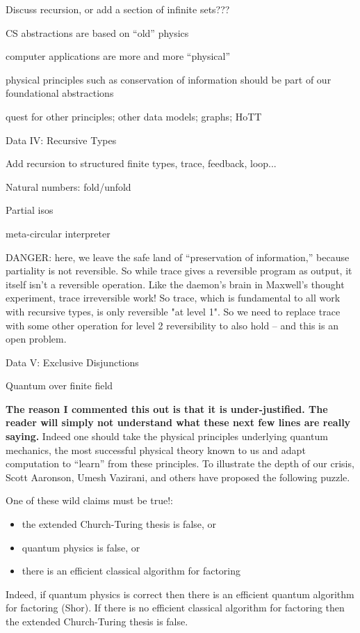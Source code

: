 \documentclass{article}
\newcommand{\jc}[1]{\fbox{Jacques says:} \textbf{#1}}
\begin{document}
Discuss recursion, or add a section of infinite sets???

CS abstractions are based on ``old'' physics

computer applications are more and more ``physical''

physical principles such as conservation of information should be part
of our foundational abstractions

quest for other principles; other data models; graphs; HoTT

Data IV: Recursive Types

Add recursion to structured finite types, trace, feedback, loop...

Natural numbers: fold/unfold

Partial isos

meta-circular interpreter

DANGER: here, we leave the safe land of ``preservation of information,''
because partiality is not reversible. So while trace gives a reversible
program as output, it itself isn't a reversible operation. Like the
daemon's brain in Maxwell's thought experiment, trace irreversible work!
So trace, which is fundamental to all work with recursive types, is
only reversible "at level 1". So we need to replace trace with some other
operation for level 2 reversibility to also hold -- and this is an open
problem.

Data V: Exclusive Disjunctions

Quantum over finite field

\jc{The reason I commented this out is that it is under-justified. The
reader will simply not understand what these next few lines are really
saying.}
Indeed one should take the physical principles underlying quantum mechanics,
the most successful physical theory known to us and adapt computation to
``learn'' from these principles. To illustrate the depth of our crisis, Scott
Aaronson, Umesh Vazirani, and others have proposed the following puzzle.

One of these wild claims must be true!:
\begin{itemize}
\item the extended Church-Turing thesis is false, or
\item quantum physics is false, or
\item there is an efficient classical algorithm for factoring
\end{itemize}
Indeed, if quantum physics is correct then there is an efficient quantum
algorithm for factoring (Shor). If there is no efficient classical algorithm
for factoring then the extended Church-Turing thesis is false.
\end{document}
